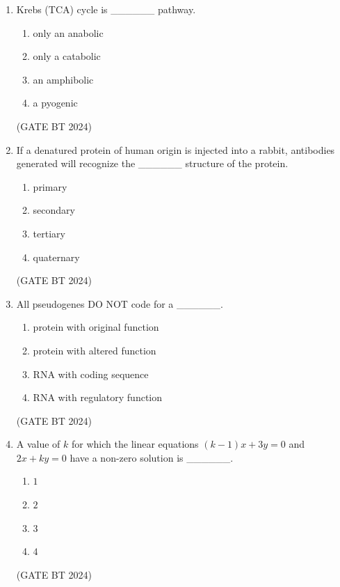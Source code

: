 \documentclass[journal,12pt,onecolumn]{IEEEtran}
\theoremstyle{remark}
\begin{document}
\begin{enumerate}
\item 
Krebs (TCA) cycle is \_\_\_\_\_\_ pathway.
\begin{multicols}{2}
\begin{enumerate}
    \item only an anabolic
    \item only a catabolic
    \item an amphibolic
    \item a pyogenic
\end{enumerate}
\end{multicols}
\hfill(GATE BT 2024)

\item 
If a denatured protein of human origin is injected into a rabbit, antibodies generated will recognize the \_\_\_\_\_\_ structure of the protein.
\begin{multicols}{2}
\begin{enumerate}
    \item primary
    \item secondary
    \item tertiary
    \item quaternary
\end{enumerate}
\end{multicols}
\hfill(GATE BT 2024)

\item 
All pseudogenes DO NOT code for a \_\_\_\_\_\_.
\begin{multicols}{2}
\begin{enumerate}
    \item protein with original function
    \item protein with altered function
    \item RNA with coding sequence
    \item RNA with regulatory function
\end{enumerate}
\end{multicols}
\hfill(GATE BT 2024)

\item 
A value of $k$ for which the linear equations $(k-1)x+3y=0$ and $2x+ky=0$ have a non-zero solution is \_\_\_\_\_\_.
\begin{multicols}{2}
\begin{enumerate}
    \item $1$
    \item $2$
    \item $3$
    \item $4$
\end{enumerate}
\end{multicols}
\hfill(GATE BT 2024)


\end{enumerate}
\end{document}
